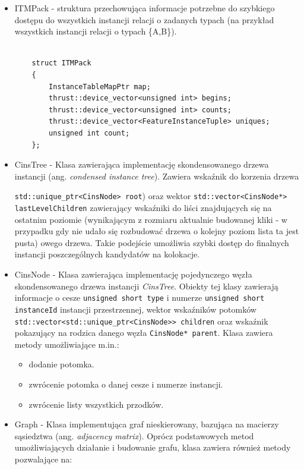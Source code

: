 \documentclass[12pt]{article}
\def\inline{\lstinline[basicstyle=\ttfamily,keywordstyle={}]}
\begin{document}
\begin{itemize}
\item ITMPack - struktura przechowująca informacje potrzebne do szybkiego dostępu do wszystkich instancji relacji o zadanych typach (na przykład wszystkich instancji relacji o typach \{A,B\}).

\begin{minipage}{\linewidth}
\begin{lstlisting}[caption={Kod struktury ITMPack}]

	struct ITMPack
	{
		InstanceTableMapPtr map;
		thrust::device_vector<unsigned int> begins;
		thrust::device_vector<unsigned int> counts;
		thrust::device_vector<FeatureInstanceTuple> uniques;
		unsigned int count;
	};
\end{lstlisting}
\end{minipage}

\item CinsTree - Klasa zawierająca implementację skondensowanego drzewa instancji (ang. \textit{condensed instance tree}). Zawiera wskaźnik do korzenia drzewa \raggedright \inline{std::unique_ptr<CinsNode> root}) oraz wektor \inline{std::vector<CinsNode*> lastLevelChildren} zawierający wskaźniki do liści znajdujących się na ostatnim poziomie (wynikającym z rozmiaru aktualnie budowanej kliki - w przypadku gdy nie udało się rozbudować drzewa o kolejny poziom lista ta jest pusta) owego drzewa. Takie podejście umożliwia szybki dostęp do finalnych instancji poszczególnych kandydatów na kolokacje.

\item CinsNode - Klasa zawierająca implementację pojedynczego węzła skondensowanego drzewa instancji \textit{CinsTree}. Obiekty tej klasy zawierają informacje o cesze \inline{unsigned short type} i numerze \inline{unsigned short instanceId} instancji przestrzennej, wektor wskaźników potomków \inline{std::vector<std::unique_ptr<CinsNode>> children} oraz wskaźnik pokazujący na rodzica danego węzła \inline{CinsNode* parent}. Klasa zawiera metody umożliwiające m.in.:

\begin{itemize}
\item dodanie potomka.
\item zwrócenie potomka o danej cesze i numerze instancji.
\item zwrócenie listy wszystkich przodków.
\end{itemize}

\item Graph - Klasa implementująca graf nieskierowany, bazująca na macierzy sąsiedztwa (ang. \textit{adjacency matrix}). Oprócz podstawowych metod umożliwiających działanie i budowanie grafu, klasa zawiera również metody pozwalające na:


\end{itemize}
\end{document}
